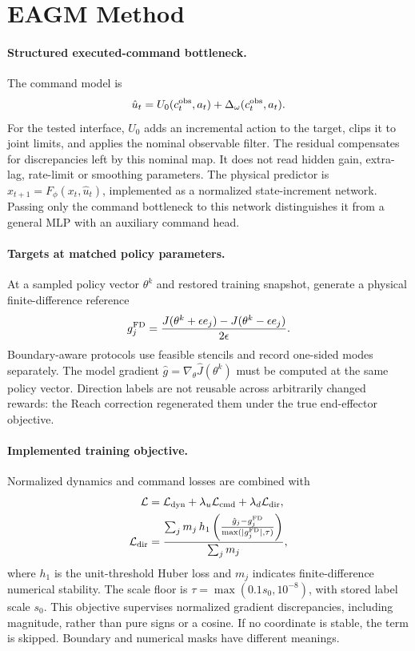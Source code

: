 \section{EAGM Method}
\paragraph{Structured executed-command bottleneck.}
The command model is
\begin{equation}
 \hat u_t=U_0(c_t^{\rm obs},a_t)+\Delta_\omega(c_t^{\rm obs},a_t).
\end{equation}
For the tested interface, $U_0$ adds an incremental action to the target, clips it to joint limits, and applies the nominal observable filter. The residual compensates for discrepancies left by this nominal map. It does not read hidden gain, extra-lag, rate-limit or smoothing parameters. The physical predictor is $\hat x_{t+1}=F_\phi(x_t,\hat u_t)$, implemented as a normalized state-increment network. Passing only the command bottleneck to this network distinguishes it from a general MLP with an auxiliary command head.

\paragraph{Targets at matched policy parameters.}
At a sampled policy vector $\theta^k$ and restored training snapshot, generate a physical finite-difference reference
\begin{equation}
 g^{\rm FD}_j=\frac{J(\theta^k+\epsilon e_j)-J(\theta^k-\epsilon e_j)}{2\epsilon}.
\end{equation}
Boundary-aware protocols use feasible stencils and record one-sided modes separately. The model gradient $\hat g=\nabla_\theta\hat J(\theta^k)$ must be computed at the same policy vector. Direction labels are not reusable across arbitrarily changed rewards: the Reach correction regenerated them under the true end-effector objective.

\paragraph{Implemented training objective.}
Normalized dynamics and command losses are combined with
\begin{align}
 \mathcal L&=\mathcal L_{\rm dyn}+\lambda_u\mathcal L_{\rm cmd}
             +\lambda_d\mathcal L_{\rm dir},\\
 \mathcal L_{\rm dir}&=\frac{\sum_j m_j\,h_1\left(
 \frac{\hat g_j-g^{\rm FD}_j}{\max(|g^{\rm FD}_j|,\tau)}\right)}{\sum_jm_j},
\end{align}
where $h_1$ is the unit-threshold Huber loss and $m_j$ indicates finite-difference numerical stability. The scale floor is $\tau=\max(0.1s_0,10^{-8})$, with stored label scale $s_0$. This objective supervises normalized gradient discrepancies, including magnitude, rather than pure signs or a cosine. If no coordinate is stable, the term is skipped. Boundary and numerical masks have different meanings.

